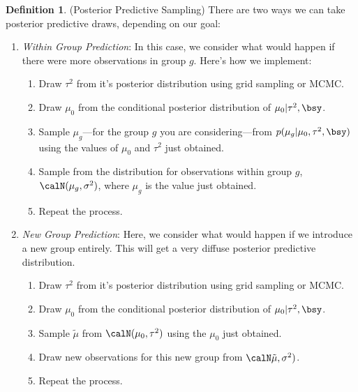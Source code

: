 \documentclass[12pt]{article}
\theoremstyle{plain}
\theoremstyle{definition}
\newtheorem{defn}[thm]{Definition}
\theoremstyle{remark}
\begin{document}
\begin{defn}(Posterior Predictive Sampling)
There are two ways we can take posterior predictive draws, depending on
our goal:
\begin{enumerate}
  \item
    \emph{Within Group Prediction}:
    In this case, we consider what would happen if there were more
    observations in group $g$.
    Here's how we implement:
    \begin{enumerate}
      \item Draw $\tau^2$ from it's posterior distribution using grid
        sampling or MCMC.
      \item Draw $\mu_0$ from the conditional posterior distribution of
        $\mu_0 |\tau^2, \bsy$.
      \item Sample $\mu_g$---for the group $g$ you are
        considering---from $p(\mu_g | \mu_0, \tau^2, \bsy)$ using the
        values of $\mu_0$ and $\tau^2$ just obtained.
      \item Sample from the distribution for observations within group
        $g$, $\calN(\mu_g, \sigma^2)$, where $\mu_g$ is the value just
        obtained.
      \item Repeat the process.
    \end{enumerate}
  \item \emph{New Group Prediction}:
    Here, we consider what would happen if we introduce a new group
    entirely. This will get a very diffuse posterior predictive
    distribution.
    \begin{enumerate}
      \item Draw $\tau^2$ from it's posterior distribution using grid
        sampling or MCMC.
      \item Draw $\mu_0$ from the conditional posterior distribution of
        $\mu_0 |\tau^2, \bsy$.
      \item Sample $\tilde{\mu}$ from $\calN(\mu_0, \tau^2)$ using the
        $\mu_0$ just obtained.
      \item Draw new observations for this new group from
        $\calN\tilde{\mu}, \sigma^2)$.
      \item Repeat the process.
    \end{enumerate}
\end{enumerate}
\end{defn}
\end{document}
